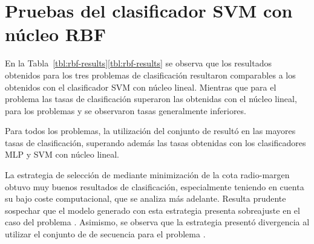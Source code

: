 %
%
%
\section{Pruebas del clasificador SVM con núcleo RBF}
%
En la \iflatexml{}Tabla~\ref{tbl:rbf-results}\else\autoref{tbl:rbf-results}\fi{}
se observa que los resultados obtenidos para los tres problemas de
clasificación resultaron comparables a los obtenidos con el
clasificador SVM con núcleo lineal.
Mientras que para el problema \prob\tripletsvm{} las tasas de
clasificación superaron las obtenidas con el núcleo lineal, para los
problemas \prob\mipred{} y \prob\micropred{} se observaron tasas
generalmente inferiores.

Para todos los problemas, la utilización del conjunto de 
 resultó en las mayores tasas de clasificación, superando
además las tasas obtenidas con los clasificadores MLP y SVM con núcleo
lineal.

La estrategia de selección de  mediante minimización de la
cota radio-margen obtuvo muy buenos resultados de clasificación, especialmente
teniendo en cuenta su bajo coste computacional, que se analiza más
adelante.
Resulta prudente sospechar que el modelo generado con esta estrategia
presenta sobreajuste en el caso del problema \prob\tripletsvm{}.
Asimismo, se observa que la estrategia presentó divergencia al
utilizar el conjunto de  de secuencia  para el
problema \prob\mipred{}.

